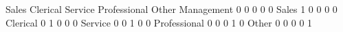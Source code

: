 \begin{Schunk}
\begin{Soutput}
             Sales Clerical Service Professional Other
Management       0        0       0            0     0
Sales            1        0       0            0     0
Clerical         0        1       0            0     0
Service          0        0       1            0     0
Professional     0        0       0            1     0
Other            0        0       0            0     1
\end{Soutput}
\end{Schunk}
